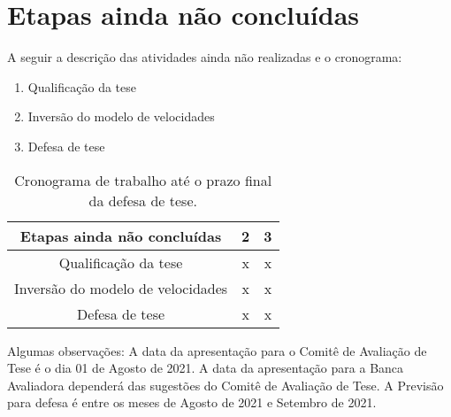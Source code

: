\section{Etapas ainda não concluídas}

A seguir a descrição das atividades ainda não realizadas e o cronograma:

  \begin{enumerate}
   \item Qualificação da tese
   \item Inversão do modelo de velocidades
   \item Defesa de tese
  \end{enumerate}
  
   \begin{table}[H]
      \caption{Cronograma de trabalho até o prazo final da defesa de tese.}
      \centering
      
      \begin{tabular}{|c|c|c|}

      \hline
      \textbf{Etapas ainda não concluídas} & 2 & 3 \\ \hline
      Qualificação da tese & x & x \\ \hline
      Inversão do modelo de velocidades & x & x \\ \hline
      Defesa de tese & x & x  \\
      \hline
      
      \end{tabular}
  \end{table}
  

Algumas observações: A data da apresentação para o Comitê de Avaliação de Tese é o dia 01 de Agosto de 2021.
A data da apresentação para a Banca Avaliadora dependerá das sugestões do
Comitê de Avaliação de Tese. A Previsão para defesa é entre os meses de Agosto de
2021 e Setembro de 2021.

